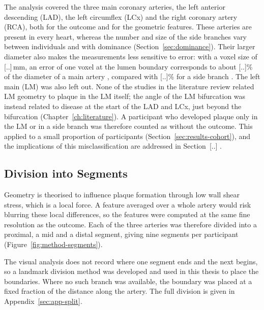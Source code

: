 The analysis covered the three main coronary arteries, the left anterior descending (LAD), the left circumflex (LCx) and the right coronary artery (RCA), both for the outcome and for the geometric features.
These arteries are present in every heart, whereas the number and size of the side branches vary between individuals and with dominance (Section~\ref{sec:dominance}).
Their larger diameter also makes the measurements less sensitive to error: with a voxel size of [..]\,mm, an error of one voxel at the lumen boundary corresponds to about [..]\% of the diameter of a main artery \cite{dodge1992diameter}, compared with [..]\% for a side branch .
The left main (LM) was also left out.
None of the studies in the literature review related LM geometry to plaque in the LM itself; the angle of the LM bifurcation was instead related to disease at the start of the LAD and LCx, just beyond the bifurcation (Chapter~\ref{ch:literature}).
A participant who developed plaque only in the LM or in a side branch was therefore counted as without the outcome.
This applied to a small proportion of participants (Section~\ref{sec:results-cohort}), and the implications of this misclassification are addressed in Section~[..] .                                                                           

\subsection{Division into Segments}
\label{sec:method-split}

Geometry is theorised to influence plaque formation through low wall shear stress, which is a local force. 
A feature averaged over a whole artery would risk blurring these local differences, so the features were computed at the same fine resolution as the outcome.
Each of the three arteries was therefore divided into a proximal, a mid and a distal segment, giving nine segments per participant (Figure~\ref{fig:method-segments}).

The visual analysis does not record where one segment ends and the next begins, so a landmark division method was developed and used in this thesis to place the boundaries.
Where no such branch was available, the boundary was placed at a fixed fraction of the distance along the artery.
The full division is given in Appendix~\ref{sec:app-split}.


